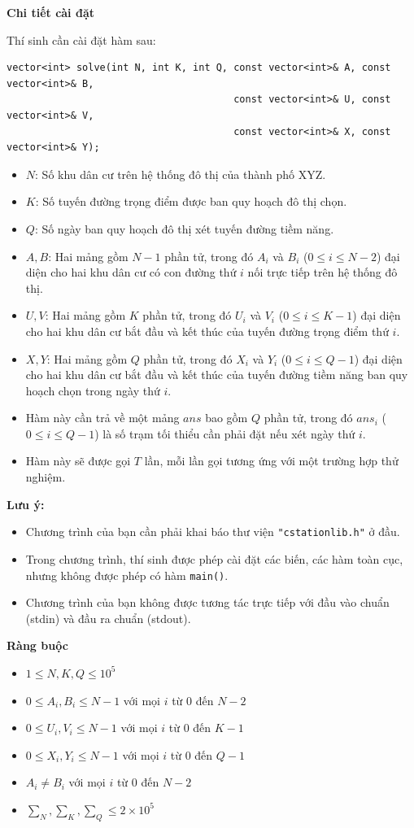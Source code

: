 \textbf{Chi tiết cài đặt}

Thí sinh cần cài đặt hàm sau:

\begin{lstlisting}
vector<int> solve(int N, int K, int Q, const vector<int>& A, const vector<int>& B,
                                       const vector<int>& U, const vector<int>& V,
                                       const vector<int>& X, const vector<int>& Y);
\end{lstlisting}

\begin{itemize}
   \item $N$: Số khu dân cư trên hệ thống đô thị của thành phố XYZ.
   \item $K$: Số tuyến đường trọng điểm được ban quy hoạch đô thị chọn.
   \item $Q$: Số ngày ban quy hoạch đô thị xét tuyến đường tiềm năng.
   \item $A,B$: Hai mảng gồm $N-1$ phần tử, trong đó $A_i$ và $B_i$ ($0\le i\le N-2$) đại diện cho hai khu dân cư có con đường thứ $i$ nối trực tiếp trên hệ thống đô thị.
   \item $U,V$: Hai mảng gồm $K$ phần tử, trong đó $U_i$ và $V_i$ ($0\le i\le K-1$) đại diện cho hai khu dân cư bắt đầu và kết thúc của tuyến đường trọng điểm thứ $i$.
   \item $X,Y$: Hai mảng gồm $Q$ phần tử, trong đó $X_i$ và $Y_i$ ($0\le i\le Q-1$) đại diện cho hai khu dân cư bắt đầu và kết thúc của tuyến đường tiềm năng ban quy hoạch chọn trong ngày thứ $i$.
   \item Hàm này cần trả về một mảng $ans$ bao gồm $Q$ phần tử, trong đó $ans_i$ ($0\le i\le Q-1$) là số trạm tối thiểu cần phải đặt nếu xét ngày thứ $i$.
   \item Hàm này sẽ được gọi $T$ lần, mỗi lần gọi tương ứng với một trường hợp thử nghiệm.
\end{itemize}

\textbf{Lưu ý:}
\begin{itemize}
   \item Chương trình của bạn cần phải khai báo thư viện \texttt{"cstationlib.h"} ở đầu.
   \item Trong chương trình, thí sinh được phép cài đặt các biến, các hàm toàn cục, nhưng không được phép có hàm \texttt{main()}.
   \item Chương trình của bạn không được tương tác trực tiếp với đầu vào chuẩn (stdin) và đầu ra chuẩn (stdout).
\end{itemize}

\textbf{Ràng buộc}

\begin{itemize}
   \item $1\le N,K,Q\le 10^5$
   \item $0\le A_i,B_i\le N-1$ với mọi $i$ từ $0$ đến $N-2$
   \item $0\le U_i,V_i\le N-1$ với mọi $i$ từ $0$ đến $K-1$
   \item $0\le X_i,Y_i\le N-1$ với mọi $i$ từ $0$ đến $Q-1$
   \item $A_i\ne B_i$ với mọi $i$ từ $0$ đến $N-2$
   \item $\sum_N,\sum_K,\sum_Q\le 2\times 10^5$
\end{itemize}